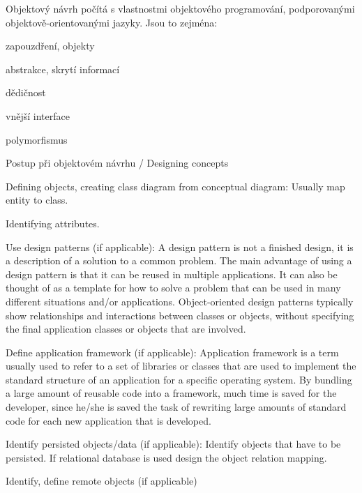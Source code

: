 \begin{poznamka}
Objektový návrh počítá s vlastnostmi objektového programování, podporovanými objektově-orientovanými jazyky. Jsou to zejména:
\begin{pitemize}
    \item zapouzdření, objekty
    \item abstrakce, skrytí informací
    \item dědičnost
    \item vnější interface
    \item polymorfismus
\end{pitemize}
\end{poznamka}

\begin{obecne}{Postup při objektovém návrhu / Designing concepts}
\begin{pitemize}
    \item Defining objects, creating class diagram from conceptual diagram: Usually map entity to class.
    \item Identifying attributes.
    \item Use design patterns (if applicable): A design pattern is not a finished design, it is a description of a solution to a common problem. The main advantage of using a design pattern is that it can be reused in multiple applications. It can also be thought of as a template for how to solve a problem that can be used in many different situations and/or applications. Object-oriented design patterns typically show relationships and interactions between classes or objects, without specifying the final application classes or objects that are involved.
    \item Define application framework (if applicable): Application framework is a term usually used to refer to a set of libraries or classes that are used to implement the standard structure of an application for a specific operating system. By bundling a large amount of reusable code into a framework, much time is saved for the developer, since he/she is saved the task of rewriting large amounts of standard code for each new application that is developed.
    \item Identify persisted objects/data (if applicable): Identify objects that have to be persisted. If relational database is used design the object relation mapping.
    \item Identify, define remote objects (if applicable)
\end{pitemize}
\end{obecne}

